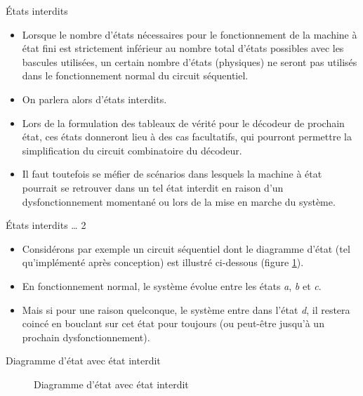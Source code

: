 \documentclass[presentation]{beamer}
\begin{document}
\begin{frame}[label={sec:org866521e}]{États interdits}
\begin{itemize}
\item Lorsque le nombre d'états nécessaires pour le fonctionnement de la machine à état fini est strictement inférieur au nombre total d'états possibles avec les bascules utilisées, un certain nombre d'états (physiques) ne seront pas utilisés dans le fonctionnement normal du circuit séquentiel.

\item On parlera alors d'\alert{états interdits}.

\item Lors de la formulation des tableaux de vérité pour le décodeur de prochain état, ces états donneront lieu à des cas facultatifs, qui pourront permettre la simplification du circuit combinatoire du décodeur.

\item Il faut toutefois se méfier de scénarios dans lesquels la machine à état pourrait se retrouver dans un tel état interdit en raison d'un dysfonctionnement momentané ou lors de la mise en marche du système.
\end{itemize}
\end{frame}

\begin{frame}[label={sec:orgada775a}]{États interdits \ldots{} 2}
\begin{itemize}
\item Considérons par exemple un circuit séquentiel dont le diagramme d'état (tel qu'implémenté après conception) est illustré ci-dessous (figure \ref{fig:orgf6e0c39}).

\item En fonctionnement normal, le système évolue entre les états \emph{a}, \emph{b} et \emph{c}.

\item Mais si pour une raison quelconque, le système entre dans l'état \emph{d}, il restera coincé en bouclant sur cet état pour toujours (ou peut-être jusqu'à un prochain dysfonctionnement).
\end{itemize}
\end{frame}

\begin{frame}[label={sec:orgdd13ba4}]{Diagramme d'état avec état interdit}
\begin{figure}[htbp]
\centering

\caption{\label{fig:orgf6e0c39}Diagramme d'état avec état interdit}
\end{figure}
\end{frame}
\end{document}
